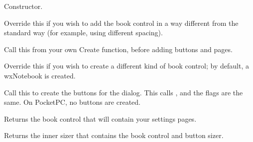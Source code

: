 Constructor.

\label{wxpropertysheetdialogaddbookctrl}


Override this if you wish to add the book control in a way different from the
standard way (for example, using different spacing).

\label{wxpropertysheetdialogcreate}


Call this from your own Create function, before adding buttons and pages.

\label{wxpropertysheetdialogcreatebookctrl}


Override this if you wish to create a different kind of book control; by default, a wxNotebook
is created.

\label{wxpropertysheetdialogcreatebuttons}


Call this to create the buttons for the dialog. This calls , and
the flags are the same. On PocketPC, no buttons are created.

\label{wxpropertysheetdialoggetbookctrl}


Returns the book control that will contain your settings pages.

\label{wxpropertysheetdialoggetinnersizer}


Returns the inner sizer that contains the book control and button sizer.

\label{wxpropertysheetdialoglayoutdialog}

